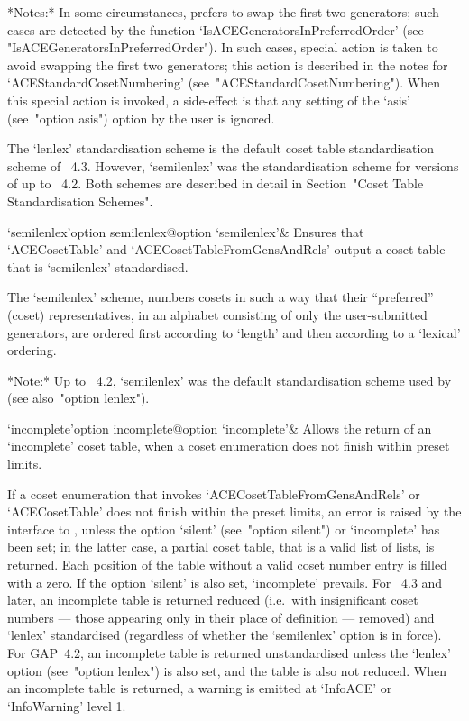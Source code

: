 *Notes:*
In  some  circumstances,  {\ACE}  prefers  to  swap  the   first   two
generators;   such   cases    are    detected    by    the    function
`IsACEGeneratorsInPreferredOrder'                                 (see
"IsACEGeneratorsInPreferredOrder"). In such cases, special  action  is
taken to avoid {\ACE} swapping the first two generators;  this  action
is   described   in   the   notes   for    `ACEStandardCosetNumbering'
(see~"ACEStandardCosetNumbering").  When  this   special   action   is
invoked, a side-effect is that any setting of the `asis'  (see~"option
asis") option by the user is ignored.

The  `lenlex'  standardisation  scheme  is  the  default  coset  table
standardisation scheme of {\GAP}~4.3. However,  `semilenlex'  was  the
standardisation scheme for versions of {\GAP} up to  {\GAP}~4.2.  Both
schemes   are   described   in   detail   in   Section~"Coset    Table
Standardisation Schemes".

\>`semilenlex'{option semilenlex}@{option `semilenlex'}& 
Ensures that `ACECosetTable' and `ACECosetTableFromGensAndRels' output
a coset table that is `semilenlex' standardised.

The `semilenlex' scheme, numbers cosets  in  such  a  way  that  their
``preferred'' (coset) representatives, in an  alphabet  consisting  of
only the user-submitted generators, are  ordered  first  according  to
`length' and then according to a `lexical' ordering.

*Note:*
Up to {\GAP}~4.2, `semilenlex' was the default standardisation  scheme
used by {\GAP} (see also~"option lenlex").

\>`incomplete'{option incomplete}@{option `incomplete'}& 
Allows the return  of  an  `incomplete'  coset  table,  when  a  coset
enumeration does not finish within preset limits.

If a coset enumeration that invokes `ACECosetTableFromGensAndRels'  or
`ACECosetTable' does not finish within the preset limits, an error  is
raised  by  the  interface  to  {\GAP},  unless  the  option  `silent'
(see~"option silent") or `incomplete' has  been  set;  in  the  latter
case, a partial coset table, that is a valid {\GAP} list of lists,  is
returned. Each position of the table  without  a  valid  coset  number
entry is filled with a zero. If  the  option  `silent'  is  also  set,
`incomplete' prevails. For {\GAP}~4.3 and later, an  incomplete  table
is returned reduced (i.e.~with insignificant coset numbers  ---  those
appearing only in their place of definition --- removed) and  `lenlex'
standardised (regardless of whether  the  `semilenlex'  option  is  in
force). For GAP~4.2, an incomplete table  is  returned  unstandardised
unless the `lenlex' option (see~"option lenlex") is also set, and  the
table is also not reduced. When an incomplete  table  is  returned,  a
warning is emitted at `InfoACE' or `InfoWarning' level 1.

